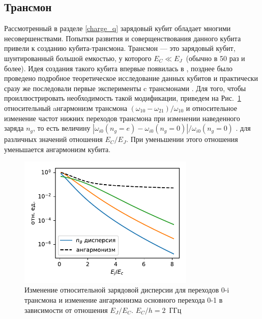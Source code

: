 \subsection{Трансмон} Рассмотренный в разделе \ref{charge_q} зарядовый кубит обладает многими несовершенствами. Попытки развития и соверщенствования данного кубита привели к созданию кубита-трансмона. Трансмон --- это зарядовый кубит, шунтированный большой емкостью, у которого $E_C \ll E_J$~(обычно в 50 раз и более). Идея создания такого кубита впервые появилась в \cite{cottet2002implementation}, позднее было проведено подробное теоретическое исследование данных кубитов \cite{koch2007charge} и практически сразу же последовали первые эксперименты c трансмонами \cite{transmon}. Для того, чтобы проиллюстрировать необходимость такой модификации, приведем на Рис.~\ref{img: disp_vs_anh} относительный  aнгармонизм трансмона $(\omega_{10}-\omega_{21})/\omega_{10}$ и относительное изменение частот нижних переходов трансмона при изменении наведенного заряда $n_g$, то есть величину $|\omega_{i0}(n_g=e)-\omega_{i0}(n_g=0)|/\omega_{i0}(n_g=0)$ .  для различных значений отношения $E_C/E_J$. При уменьшении этого отношения уменьшается ангармонизм кубита.
\begin{figure}[h]\center
	\includegraphics[width=0.75\textwidth]{images/disp_vs_anh.pdf}
	\caption{Изменение относительной зарядовой дисперсии для переходов 0-i трансмона и изменение ангармонизма основного перехода 0-1 в зависимости от отношения $E_J/E_C$. $E_C/h = 2$~ГГц}
	\label{img: disp_vs_anh}
\end{figure}
